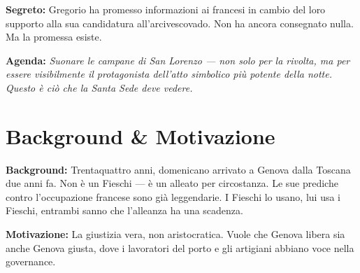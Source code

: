 \clearpage
\begin{secretbox}
\textbf{Segreto:} Gregorio ha promesso informazioni ai francesi in cambio del loro supporto alla sua candidatura all'arcivescovado. Non ha ancora consegnato nulla. Ma la promessa esiste.

\medskip\noindent\textcolor{SecretRed}{\textbf{Agenda:}} \textit{Suonare le campane di San Lorenzo --- non solo per la rivolta, ma per essere visibilmente il protagonista dell'atto simbolico pi\`u potente della notte. Questo \`e ci\`o che la Santa Sede deve vedere.}
\end{secretbox}

\clearpage



\section*{Background \& Motivazione}
\begin{rulebox}{}
\textbf{Background:} Trentaquattro anni, domenicano arrivato a Genova dalla Toscana due anni fa. Non \`e un Fieschi --- \`e un alleato per circostanza. Le sue prediche contro l'occupazione francese sono gi\`a leggendarie. I Fieschi lo usano, lui usa i Fieschi, entrambi sanno che l'alleanza ha una scadenza.

\medskip\noindent\textcolor{FieschiGreen}{\textbf{Motivazione:}} La giustizia vera, non aristocratica. Vuole che Genova libera sia anche Genova giusta, dove i lavoratori del porto e gli artigiani abbiano voce nella governance.
\end{rulebox}

